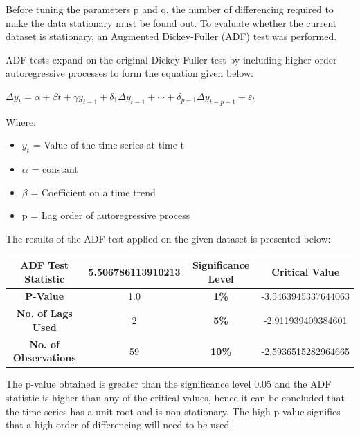 \documentclass[12pt]{mcmthesis}
\begin{document}
    Before tuning the parameters p and q, the number of differencing required to make the data stationary must be found out. To evaluate whether the current dataset is stationary, an Augmented Dickey-Fuller (ADF) test was performed.

    ADF tests expand on the original Dickey-Fuller test by including higher-order autoregressive processes to form the equation given below:

    ${\Delta y_{t}=\alpha +\beta t+\gamma y_{t-1}+\delta _{1}\Delta y_{t-1}+\cdots +\delta _{p-1}\Delta y_{t-p+1}+\varepsilon _{t}}$

    Where:
    \begin{itemize}[nosep]
        \item ${y_{t}}$ = Value of the time series at time t
        \item ${\alpha}$ = constant
        \item ${\beta}$ = Coefficient on a time trend
        \item {p} = Lag order of autoregressive process
    \end{itemize}

    The results of the ADF test applied on the given dataset is presented below:

    \begin{center}
        \begin{tabular}{ |c|c|c|c|}
            \hline
            \textbf{ADF Test Statistic}  & 5.506786113910213 & \textbf{Significance Level} & \textbf{Critical Value} \\
            \hline
            \textbf{P-Value}             & 1.0               & \textbf{1\%}                & -3.5463945337644063     \\
            \hline
            \textbf{No. of Lags Used}    & 2                 & \textbf{5\%}                & -2.911939409384601      \\
            \hline
            \textbf{No. of Observations} & 59                & \textbf{10\%}               & -2.5936515282964665     \\
            \hline
        \end{tabular}
    \end{center}

    The p-value obtained is greater than the significance level 0.05 and the ADF statistic is higher than any of the critical values, hence it can be concluded that the time series has a unit root and is non-stationary. The high p-value signifies that a high order of differencing will need to be used.
\end{document}
